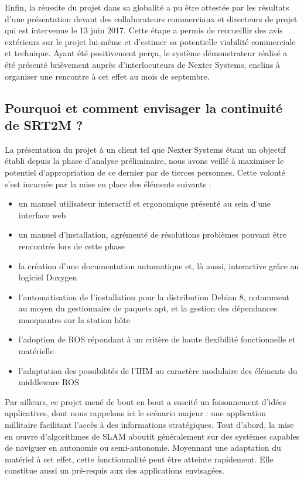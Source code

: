   Enfin, la réussite du projet dans sa globalité a pu être attestée par les résultats d'une présentation devant des collaborateurs commerciaux et directeurs de projet qui est intervenue le 13 juin 2017.
  Cette étape a permis de reccueillir des avis extérieurs sur le projet lui-même et d'estimer sa potentielle viabilité commerciale et technique. 
  Ayant été positivement perçu, le système démonstrateur réalisé a été présenté brièvement auprès d'interlocuteurs de Nexter Systems, enclins à organiser une rencontre à cet effet au mois de septembre. 
  
  \subsection{Pourquoi et comment envisager la continuité de SRT2M ?}
  
  La présentation du projet à un client tel que Nexter Systems étant un objectif établi depuis la phase d'analyse préliminaire, nous avons veillé à maximiser le potentiel d'appropriation de ce dernier par de tierces personnes.
  Cette volonté s'est incarnée par la mise en place des éléments suivants : 
  
  \begin{itemize}
   \item un manuel utilisateur interactif et ergonomique présenté au sein d'une interface web
   \item un manuel d'installation, agrémenté de résolutions problèmes pouvant être rencontrés lors de cette phase
   \item la création d'une documentation automatique et, là aussi, interactive grâce au logiciel Doxygen
   \item l'automatisation de l'installation pour la distribution Debian 8, notamment au moyen du gestionnaire de paquets apt, et la gestion des dépendances manquantes sur la station hôte
   \item l'adoption de ROS répondant à un critère de haute flexibilité fonctionnelle et matérielle
   \item l'adaptation des possibilités de l'IHM au caractère modulaire des éléments du middleware ROS 
  \end{itemize}
  
  
  Par ailleurs, ce projet mené de bout en bout a suscité un foisonnement d'idées applicatives, dont nous rappelons ici le scénario majeur : une application millitaire facilitant l'accès à des informations stratégiques. 
  Tout d'abord, la mise en \oe{}uvre d'algorithmes de SLAM aboutit généralement sur des systèmes capables de naviguer en autonomie ou semi-autonomie. 
  Moyennant une adaptation du matériel à cet effet, cette fonctionnalité peut être atteinte rapidement. 
  Elle constitue aussi un pré-requis aux des applications envisagées. 
  
